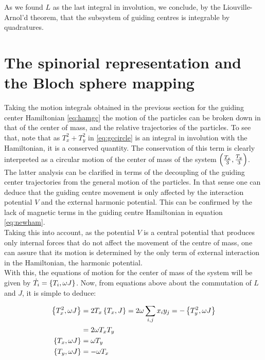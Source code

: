 As we found $L$ as the last integral in involution, we conclude, by the Liouville-Arnol'd theorem, that the subsystem of guiding centres is integrable by quadratures.\\

\section{The spinorial representation and the Bloch sphere mapping}
Taking the motion integrals obtained in the previous section for the guiding center Hamiltonian \eqref{eq:hamgc} the motion of the particles can be broken down in that of the center of mass, and the relative trajectories of the particles. To see that, note that as $T_x^2 + T_y^2$ in \eqref{eq:gccircle} is an integral in involution with the Hamiltonian, it is a conserved quantity. The conservation of this term is clearly interpreted as a circular motion of the center of mass of the system $\left( \frac{T_x}{3},\frac{T_y}{3} \right)$.\\

The latter analysis can be clarified in terms of the decoupling of the guiding center trajectories from the general motion of the particles. In that sense one can deduce that the guiding centre movement is only affected by the interaction potential $V$ and the external harmonic potential. This can be confirmed by the lack of magnetic terms in the guiding centre Hamiltonian in equation \eqref{eq:newham}.\\

Taking this into account, as the potential $V$ is a central potential that produces only internal forces that do not affect the movement of the centre of mass, one can assure that its motion is determined by the only term of external interaction in the Hamiltonian, the harmonic potential.\\

With this, the equations of motion for the center of mass of the system will be given by $\dot{T}_i = \left\lbrace T_i, {\omega}J \right\rbrace$. Now, from equations above about the commutation of $L$ and $J$, it is simple to deduce:

\begin{align*}
\left\lbrace T_x^2, \omega J \right\rbrace &= 2T_x\left\lbrace T_x, J \right\rbrace = 2\omega\sum_{i,j}x_iy_j = -\left\lbrace T_y^2, \omega J \right\rbrace\\
&= 2\omega T_xT_y \\
\left\lbrace T_x, \omega J \right\rbrace &= \omega T_y\\
\left\lbrace T_y, \omega J \right\rbrace &= -\omega T_x
\end{align*}

